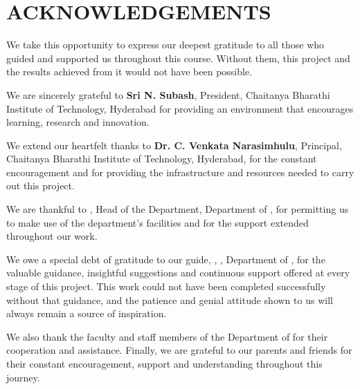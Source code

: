 \clearpage
{}
{}
\chapter*{ACKNOWLEDGEMENTS}


\noindent
\fontsize{12pt}{18pt}\selectfont We take this opportunity to express our deepest gratitude to all those who guided and supported us throughout this course. Without them, this project and the results achieved from it would not have been possible.

\noindent
We are sincerely grateful to \textbf{Sri N. Subash}, President, Chaitanya Bharathi Institute of Technology, Hyderabad for providing an environment that encourages learning, research and innovation.

\noindent
We extend our heartfelt thanks to \textbf{Dr. C. Venkata Narasimhulu}, Principal, Chaitanya Bharathi Institute of Technology, Hyderabad, for the constant encouragement and for providing the infrastructure and resources needed to carry out this project.

\noindent
We are thankful to \textbf{\depthod}, Head of the Department, Department of \thesisdept, for permitting us to make use of the department's facilities and for the support extended throughout our work.

\noindent
We owe a special debt of gratitude to our guide, \textbf{\thesisguide}, \thesisguidedesignation, Department of \thesisdept, for the valuable guidance, insightful suggestions and continuous support offered at every stage of this project. This work could not have been completed successfully without that guidance, and the patience and genial attitude shown to us will always remain a source of inspiration.

\noindent
We also thank the faculty and staff members of the Department of \thesisdept for their cooperation and assistance. Finally, we are grateful to our parents and friends for their constant encouragement, support and understanding throughout this journey.
